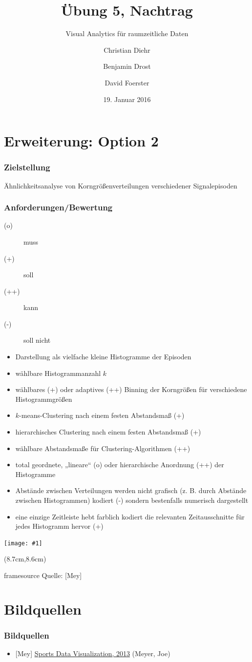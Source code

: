 \documentclass{beamer}
\title{Übung 5, Nachtrag}
\subtitle{Visual Analytics für raumzeitliche Daten}
\author{Christian Diehr \and Benjamin Drost \and David Foerster}
\institute{Institut für Informatik\\Humboldt-Universität zu Berlin}
\date{19. Januar 2016}
\newcommand{\wholeslidegraphics}[1]{
	\begin{center}
		\texttt{[image: \#1]}
	\end{center}
}
\newcommand{\graphicssource}[1]{
	\begin{textblock*}{4cm}(8.7cm,8.6cm)
		\begin{beamercolorbox}[ht=0.5cm,right]{framesource}
				\usebeamerfont{framesource}\usebeamercolor[fg]{framesource} Quelle: {#1}
		\end{beamercolorbox}
	\end{textblock*}
}
\begin{document}
\begin{frame}
		\titlepage
\end{frame}
\logo %

\section{Erweiterung: Option 2}
\begin{frame}
	\frametitle{Zielstellung}
	\begin{center}
		\Large
		Ähnlichkeitsanalyse von Korngrößenverteilungen verschiedener Signalepisoden
	\end{center}
\end{frame}

\begin{frame}
	\frametitle{Anforderungen/Bewertung}
	\begin{description}
		\item[(o)] muss
		\item[(+)] soll
		\item[(++)] kann
		\item[(-)] soll nicht
	\end{description}
\end{frame}

\begin{frame}
	\begin{itemize}
		\item Darstellung als vielfache kleine Histogramme der Episoden
		\item wählbare Histogrammanzahl $k$
		\item wählbares (+) oder adaptives (++) Binning der Korngrößen für verschiedene Histogrammgrößen
		\item $k$-means-Clustering nach einem festen Abstandsmaß (+)
		\item hierarchisches Clustering nach einem festen Abstandsmaß (+)
		\item wählbare Abstandsmaße für Clustering-Algorithmen (++)
		\item total geordnete, „lineare“ (o) oder hierarchische Anordnung (++) der Histogramme
		\item Abstände zwischen Verteilungen werden nicht grafisch (z. B. durch Abstände zwischen Histogrammen) kodiert (-) sondern bestenfalls numerisch dargestellt
		\item eine einzige Zeitleiste hebt farblich kodiert die relevanten Zeitausschnitte für jedes Histogramm hervor (+)
	\end{itemize}
\end{frame}
\begin{frame}
	\wholeslidegraphics{histogram-small-multiples}
	\graphicssource{[Mey]}
\end{frame}

\section{Bildquellen}
\begin{frame}
	\frametitle{Bildquellen}
	\begin{itemize}
		\item{[Mey] \href{http://viz.sdql.com/2014/10/31/small-multiples-starters-innings-pitched-for-each-mlb-teams-in-2013/}{Sports Data Visualization, 2013} (Meyer, Joe)}
	\end{itemize}
\end{frame}
\end{document}
